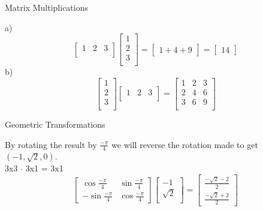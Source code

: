 \documentclass[12pt]{article}
\newcommand{\sqbrl}{\left[}
\newcommand{\sqbrr}{\right]}
\newenvironment{problem}[2][Problem]{\begin{trivlist}
\item[\hskip \labelsep {\bfseries #1}\hskip \labelsep {\bfseries #2.}]}{\end{trivlist}}
\begin{document}
 \begin{problem}{3}
 	Matrix Multiplications
 \end{problem}
 a)\\
 	\[\sqbrl\begin{matrix}1 & 2 & 3\\\end{matrix}\sqbrr\sqbrl\begin{matrix}1\\2\\3\\\end{matrix}\sqbrr
 	=\sqbrl\begin{matrix}1 + 4+ 9\end{matrix}\sqbrr
 	=\sqbrl\begin{matrix}14\end{matrix}\sqbrr\]
b)\\
	\[\sqbrl\begin{matrix}1\\2\\3\\\end{matrix}\sqbrr\sqbrl\begin{matrix}1 & 2 & 3\\\end{matrix}\sqbrr
	=\sqbrl\begin{matrix}1 & 2 & 3\\2 & 4 & 6\\3 & 6 & 9\\\end{matrix}\sqbrr\]
	
\begin{problem}{4}
	Geometric Transformations
\end{problem}
By rotating the result by $\frac{-\pi}{4}$ we will reverse the rotation made to get $(-1, \sqrt{2}, 0)$.\\
3x3 $\cdot$ 3x1 = 3x1
	\[\sqbrl\begin{matrix}\cos{\frac{-\pi}{4}} & \sin{\frac{-\pi}{4}}\\-\sin{\frac{-\pi}{4}} & \cos{\frac{-\pi}{4}}\end{matrix}\sqbrr\sqbrl\begin{matrix}-1\\\sqrt{2}\\\end{matrix}\sqbrr
	= \sqbrl\begin{matrix}\frac{-\sqrt{2}-2}{2}\\\frac{-\sqrt{2}+2}{2}\end{matrix}\sqbrr\]
	
\end{document}
